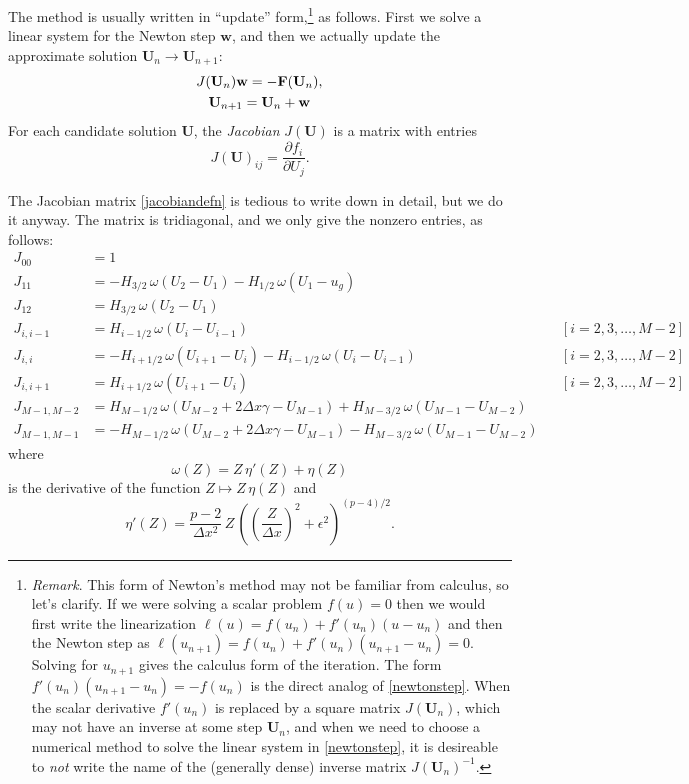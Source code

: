 \documentclass[11pt,final,reqno]{amsart}
\newcommand{\eps}{\epsilon}
\newcommand{\bbF}{\mathbf{F}}
\newcommand{\bU}{\mathbf{U}}
\newcommand{\bw}{\mathbf{w}}
\begin{document}
The method is usually written in ``update'' form,\footnote{\textsl{Remark}.  This form of Newton's method may not be familiar from calculus, so let's clarify.  If we were solving a scalar problem $f(u)=0$ then we would first write the linearization $\ell(u)=f(u_n) + f'(u_n)(u-u_n)$ and then the Newton step as $\ell(u_{n+1}) = f(u_n) + f'(u_n) (u_{n+1}-u_n) = 0$.  Solving for $u_{n+1}$ gives the calculus form of the iteration.  The form $f'(u_n) (u_{n+1} - u_n) = -f(u_n)$ is the direct analog of \eqref{newtonstep}.  When the scalar derivative $f'(u_n)$ is replaced by a square matrix $J(\bU_n)$, which may not have an inverse at some step $\bU_n$, and when we need to choose a numerical method to solve the linear system in \eqref{newtonstep}, it is desireable to \emph{not} write the name of the (generally dense) inverse matrix $J(\bU_n)^{-1}$.} as follows.  First we solve a linear system for the Newton step $\bw$, and then we actually update the approximate solution $\bU_n \to \bU_{n+1}$:
\begin{gather}
J(\bU_n) \bw = - \bbF(\bU_n), \label{newtonstep} \\
\bU_{n+1} = \bU_n + \bw \notag
\end{gather}
For each candidate solution $\bU$, the \emph{Jacobian} $J(\bU)$ is a matrix with entries
\begin{equation} \label{jacobiandefn}
J(\bU)_{ij} = \frac{\partial f_i}{\partial U_j}.
\end{equation}

The Jacobian matrix \eqref{jacobiandefn} is tedious to write down in detail, but we do it anyway.  The matrix is tridiagonal, and we only give the nonzero entries, as follows:
\begin{align*}
J_{00} &= 1 \\
J_{11} &= - H_{3/2}\, \omega(U_2-U_1) - H_{1/2}\, \omega(U_1-u_g) \\
J_{12} &= H_{3/2}\, \omega(U_2-U_1) \\
J_{i,i-1} &= H_{i-1/2}\, \omega(U_i-U_{i-1}) &&[i=2,3,\dots,M-2] \\
J_{i,i} &= - H_{i+1/2}\, \omega(U_{i+1}-U_i) - H_{i-1/2}\, \omega(U_i-U_{i-1}) &&[i=2,3,\dots,M-2] \\
J_{i,i+1} &= H_{i+1/2}\, \omega(U_{i+1}-U_i)  &&[i=2,3,\dots,M-2] \\
J_{M-1,M-2} &= H_{M-1/2}\, \omega(U_{M-2}+2\Delta x \gamma - U_{M-1}) + H_{M-3/2}\, \omega(U_{M-1}-U_{M-2}) \\
J_{M-1,M-1} &= - H_{M-1/2}\, \omega(U_{M-2}+2\Delta x \gamma - U_{M-1}) - H_{M-3/2}\, \omega(U_{M-1}-U_{M-2})
\end{align*}
where
	$$\omega(Z) = Z\, \eta'(Z) + \eta(Z)$$
is the derivative of the function $Z \mapsto Z\, \eta(Z)$ and
	$$\eta'(Z) = \frac{p-2}{\Delta x^2}\, Z\, \left(\left(\frac{Z}{\Delta x}\right)^2 + \eps^2\right)^{(p-4)/2}.$$
\end{document}
